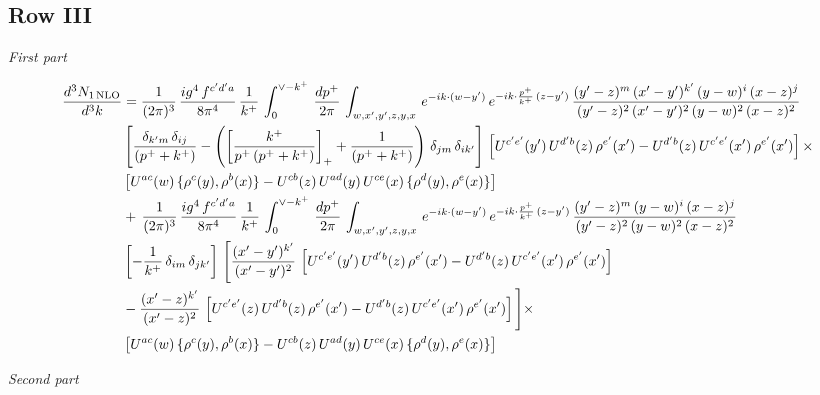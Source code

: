 \documentclass[9pt]{article}
\numberwithin{equation}{section}
\begin{document}
 \subsection{Row III}
{\color{orange}\sloppy{}\par
\par\noindent\textit{First part}\par
\begin{align*}
\frac{d^{3}N_{1\,\rm NLO}}{d^{3}k} & = \frac{1}{(2\pi)^{3}}\, \frac{ig^{4}\,f^{c'd'a}}{8\pi^{4}}\, \frac{1}{k^{+}}\,\int_{0}^{\vee - k^{+}}\,  \frac{dp^{+}}{2\pi}\, \int_{w,x',y',z,y,x}\, e^{-ik\cdot (w-y')}\, e^{-ik\cdot \frac{p^{+}}{k^{+}}\,(z-y')}\,\frac{(y'-z)^{m}\,(x'-y')^{k'}\,(y-w)^{i}\,(x-z)^{j}}{(y'-z)^{2}\,(x'-y')^{2}\,(y-w)^{2}\,(x-z)^{2}}\notag \\ & \left[\frac{\delta_{k'm}\,\delta_{ij}}{(p^{+}+k^{+})}-\left(\left[\frac{k^{+}}{p^{+}\,(p^{+}+k^{+})}\right]_{+}+\frac{1}{(p^{+}+k^{+})}\right)\,\delta_{jm}\,\delta_{ik'}\right]\, \left[U^{c'e'}(y')\,U^{d'b}(z)\,\rho^{e'}(x')-U^{d'b}(z)\,U^{c'e'}(x')\,\rho^{e'}(x')\right]\times\notag \\ & \left[U^{ac}(w)\, \{\rho^{c}(y),\rho^{b}(x)\}-U^{cb}(z)\,U^{ad}(y)\,U^{ce}(x)\,\{\rho^{d}(y),\rho^{e}(x)\}\right] \notag \\
&  +\,\frac{1}{(2\pi)^{3}}\, \frac{ig^{4}\,f^{c'd'a}}{8\pi^{4}}\, \frac{1}{k^{+}}\,\int_{0}^{\vee - k^{+}}\,  \frac{dp^{+}}{2\pi}\, \int_{w,x',y',z,y,x}\, e^{-ik\cdot (w-y')}\, e^{-ik\cdot \frac{p^{+}}{k^{+}}\,(z-y')}\,\frac{(y'-z)^{m}\,(y-w)^{i}\,(x-z)^{j}}{(y'-z)^{2}\,(y-w)^{2}\,(x-z)^{2}}\notag \\ & \left[-\frac{1}{k^{+}}\, \delta_{im}\, \delta_{jk'}\right]\, \Bigg[\frac{(x'-y')^{k'}}{(x'-y')^{2}}\,\left[U^{c'e'}(y')\,U^{d'b}(z)\,\rho^{e'}(x')-U^{d'b}(z)\,U^{c'e'}(x')\,\rho^{e'}(x')\right]\notag \\ & -\frac{(x'-z)^{k'}}{(x'-z)^{2}}\,\left[U^{c'e'}(z)\,U^{d'b}(z)\,\rho^{e'}(x')-U^{d'b}(z)\,U^{c'e'}(x')\,\rho^{e'}(x')\right]\Bigg]\times\notag \\ &   \left[U^{ac}(w)\, \{\rho^{c}(y),\rho^{b}(x)\}-U^{cb}(z)\,U^{ad}(y)\,U^{ce}(x)\,\{\rho^{d}(y),\rho^{e}(x)\}\right]
\end{align*}
\par\noindent\textit{Second part}\par
\begin{align*}

\end{align*}}
\end{document}
